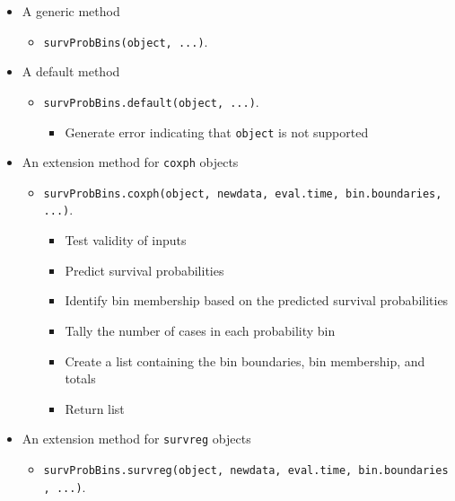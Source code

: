 \documentclass[
]{book}
\providecommand{\tightlist}{%
  \setlength{\itemsep}{0pt}\setlength{\parskip}{0pt}}
\begin{document}
\begin{itemize}
\tightlist
\item
  A generic method

  \begin{itemize}
  \tightlist
  \item
    \texttt{survProbBins(object,\ ...)}.
  \end{itemize}
\item
  A default method

  \begin{itemize}
  \tightlist
  \item
    \texttt{survProbBins.default(object,\ ...)}.

    \begin{itemize}
    \tightlist
    \item
      Generate error indicating that \texttt{object} is not supported
    \end{itemize}
  \end{itemize}
\item
  An extension method for \texttt{coxph} objects

  \begin{itemize}
  \tightlist
  \item
    \texttt{survProbBins.coxph(object,\ newdata,\ eval.time,\ bin.boundaries,\ ...)}.

    \begin{itemize}
    \tightlist
    \item
      Test validity of inputs
    \item
      Predict survival probabilities
    \item
      Identify bin membership based on the predicted survival probabilities
    \item
      Tally the number of cases in each probability bin
    \item
      Create a list containing the bin boundaries, bin membership, and totals
    \item
      Return list
    \end{itemize}
  \end{itemize}
\item
  An extension method for \texttt{survreg} objects

  \begin{itemize}
  \tightlist
  \item
    \texttt{survProbBins.survreg(object,\ newdata,\ eval.time,\ bin.boundaries,\ ...)}.


\end{itemize}
\end{itemize}
\end{document}
